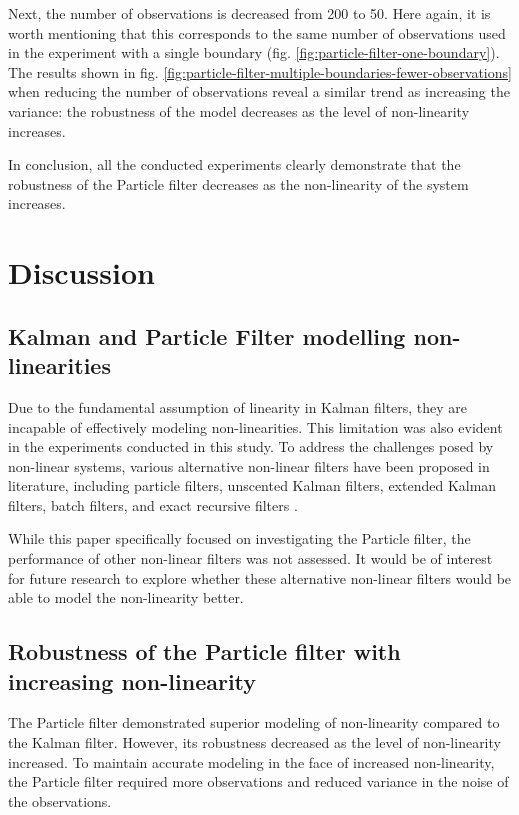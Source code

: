 \documentclass[conference]{IEEEtran}
\begin{document}
Next, the number of observations is decreased from 200 to 50.
Here again, it is worth mentioning that this corresponds to the same number of observations used in the experiment with a single boundary (fig. \ref{fig:particle-filter-one-boundary}).
The results shown in fig. \ref{fig:particle-filter-multiple-boundaries-fewer-observations} when reducing the number of observations reveal a similar trend as increasing the variance: the robustness of the model decreases as the level of non-linearity increases.

In conclusion, all the conducted experiments clearly demonstrate that the robustness of the Particle filter decreases as the non-linearity of the system increases.


\section{Discussion}\label{sec:discussion}

\subsection{Kalman and Particle Filter modelling non-linearities}

Due to the fundamental assumption of linearity in Kalman filters, they are incapable of effectively modeling non-linearities.
This limitation was also evident in the experiments conducted in this study.
To address the challenges posed by non-linear systems, various alternative non-linear filters have been proposed in literature, including particle filters, unscented Kalman filters, extended Kalman filters, batch filters, and exact recursive filters \cite{b5}.

While this paper specifically focused on investigating the Particle filter, the performance of other non-linear filters was not assessed.
It would be of interest for future research to explore whether these alternative non-linear filters would be able to model the non-linearity better.

\subsection{Robustness of the Particle filter with increasing non-linearity}
The Particle filter demonstrated superior modeling of non-linearity compared to the Kalman filter.
However, its robustness decreased as the level of non-linearity increased.
To maintain accurate modeling in the face of increased non-linearity, the Particle filter required more observations and reduced variance in the noise of the observations.
\end{document}

